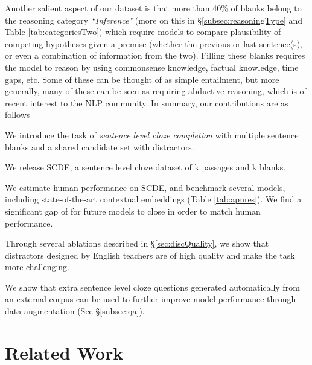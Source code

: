 \documentclass[11pt,a4paper]{article}
\newenvironment{tight_enumerate}{
\begin{enumerate}
  \setlength{\itemsep}{0pt}
  \setlength{\parskip}{0pt}
}{\end{enumerate}}
\newcommand{\dsname}{\textsc{SCDE}}
\begin{document}
Another salient aspect of our dataset is that more than 40\% of blanks belong to the reasoning category \emph{``Inference"} (more on this in \S \ref{subsec:reasoningType} and Table \ref{tab:categoriesTwo}) which require models to compare  plausibility of competing hypotheses given a premise (whether the previous or last sentence(s), or even a combination of information from the two). Filling these blanks requires the model to reason by using commonsense knowledge, factual knowledge, time gaps, etc. Some of these can be thought of as simple entailment, but more generally, many of these can be seen as requiring abductive reasoning, which is of recent interest \cite{bhagavatula2019abductive,sap2019atomic,sap2019socialiqa} to the NLP community. In summary, our contributions are as follows
\vspace{-\topsep}
\begin{tight_enumerate}
  \setlength{\parskip}{0pt}
  \setlength{\itemsep}{0pt plus 1pt}
   \item We introduce the task of \emph{sentence level cloze completion} with multiple sentence blanks and a shared candidate set with distractors. 
    \item We release \dsname, a sentence level cloze dataset of k passages and k blanks.
    \item We estimate human performance on \dsname, and benchmark several models, including state-of-the-art contextual embeddings (Table \ref{tab:apnres}). We find a significant gap of   for future models to close in order to match human performance.
    \item  Through several ablations described in \S\ref{sec:discQuality}, we show that distractors designed by English teachers are of high quality and make the task more challenging. 
    \item We show that extra sentence level cloze questions generated automatically from an external corpus can be used to further improve model performance through data augmentation (See \S \ref{subsec:qa}).
\end{tight_enumerate} \section{Related Work}
\label{sec:related}
\end{document}
